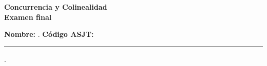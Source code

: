 \begin{center} \textbf
{
    \Large Concurrencia y Colinealidad \\ \vspace{2mm}Examen final
}
\end{center}

\textbf{Nombre:} \hrulefill. \textbf{ Código ASJT:} \rule{2cm}{0.1mm}.
\vspace{-4mm}

